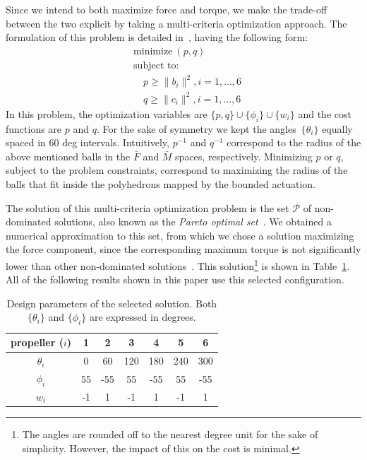 \documentclass{article}
\begin{document}
Since we intend to both maximize force and torque, we make the
trade-off between the two explicit by taking a multi-criteria
optimization approach. The formulation of this problem is detailed
in~\cite{yoda:arxiv16a}, having the following form:
\begin{equation}
  \label{eq:multi}
  \begin{aligned}
    &\text{minimize}\:(p, q) \\
    &\text{subject to:} \\
    &\quad p \geq \|b_i\|^2, i=1,\ldots,6 \\
    &\quad q \geq \|c_i\|^2, i=1,\ldots,6
  \end{aligned}
\end{equation}
In this problem, the optimization variables are
$\{p,q\}\cup\{\phi_i\}\cup\{w_i\}$ and the cost functions are $p$ and
$q$. For the sake of symmetry we kept the angles~$\{\theta_i\}$
equally spaced in $60$ deg intervals. Intuitively, $p^{-1}$ and
$q^{-1}$ correspond to the radius of the above mentioned balls in the $\bar{F}$ and
$\bar{M}$ spaces, respectively. Minimizing $p$ or $q$, subject to the
problem constraints, correspond to
maximizing the radius of the balls that fit inside the polyhedrons
mapped by the bounded actuation.

The solution of this
multi-criteria optimization problem is the set $\mathcal{P}$ of
non-dominated solutions, also known as the \emph{Pareto optimal
  set}~\cite{statnikov95}. We obtained a numerical approximation to
this set, from which we chose a solution maximizing the force
component, since the corresponding maximum torque is not significantly
lower than other non-dominated solutions~\cite{yoda:arxiv16a}. This
solution\footnote{The angles are rounded off to the nearest degree
  unit for the sake of simplicity. However, the impact of this on the
  cost is minimal.} is shown in Table~\ref{tab:selected}. All of the following
results shown in this paper use this selected configuration.

\begin{table}
  \centering
  \begin{tabular}{ccccccc}
    propeller ($i$) & 1 & 2 & 3 & 4 & 5 & 6 \\
    \hline
    $\theta_i$ & 0 & 60 & 120 & 180 & 240 & 300 \\
    $\phi_i$ & 55 & -55 & 55 & -55 & 55 & -55 \\
    $w_i$ & -1 & 1 & -1 & 1 & -1 & 1 \\
    \hline
  \end{tabular}
  \caption{Design parameters of the selected solution. Both
    $\{\theta_i\}$ and $\{\phi_i\}$ are expressed in degrees.}
  \label{tab:selected}
\end{table}
\end{document}
